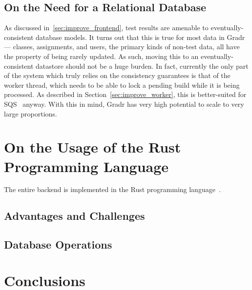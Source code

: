 \documentclass{scrartcl}
\begin{document}
\subsection{On the Need for a Relational Database}
As discussed in~\ref{sec:improve_frontend}, test results are amenable to eventually-consistent database models.
It turns out that this is true for most data in Gradr --- classes, assignments, and users, the primary kinds of non-test data, all have the property of being rarely updated.
As such, moving this to an eventually-consistent datastore should not be a huge burden.
In fact, currently the only part of the system which truly relies on the consistency guarantees is that of the worker thread, which needs to be able to lock a pending build while it is being processed.
As described in Section~\ref{sec:improve_worker}, this is better-suited for SQS~\cite{sqs} anyway.
With this in mind, Gradr has very high potential to scale to very large proportions.

\section{On the Usage of the Rust Programming Language}
The entire backend is implemented in the Rust programming language~\cite{rust}.

\subsection{Advantages and Challenges}
\subsection{Database Operations}

\section{Conclusions}

{}

\end{document}
